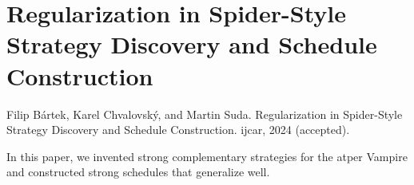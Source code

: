 \section{Regularization in Spider-Style Strategy Discovery and Schedule Construction}
\label{sec:results:regularization}

Filip Bártek, Karel Chvalovský, and Martin Suda. Regularization in Spider-Style Strategy Discovery and Schedule Construction. \Gls{ijcar}, 2024 (accepted). \cite{bartek2024regularization}

In this paper, we invented strong complementary strategies for the \gls{atper} Vampire and constructed strong schedules that generalize well.


